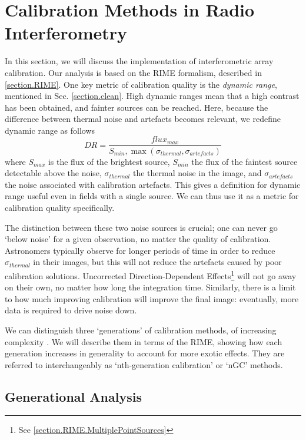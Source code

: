 
\section{Calibration Methods in Radio Interferometry}\label{section.calibration}
\pg
In this section, we will discuss the implementation of interferometric array calibration. Our analysis is based on the RIME formalism, described in \cref{section.RIME}. One key metric of calibration quality is the \emph{dynamic range}, mentioned in Sec. \ref{section.clean}. High dynamic ranges mean that a high contrast has been obtained, and fainter sources can be reached. Here, because the difference between thermal noise and artefacts becomes relevant, we redefine dynamic range as follows
\begin{equation}\label{eq.DR}
DR = \frac{flux_{max}}{S_{min},\max(\sigma_{thermal},\sigma_{artefacts})}
\end{equation}
where $S_{max}$ is the flux of the brightest source, $S_{min}$ the flux of the faintest source detectable above the noise, $\sigma_{thermal}$ the thermal noise in the image, and $\sigma_{artefacts}$ the noise associated with calibration artefacts. This gives a definition for dynamic range useful even in fields with a single source. We can thus use it as a metric for calibration quality specifically.

\pg
The distinction between these two noise sources is crucial; one can never go `below noise' for a given observation, no matter the quality of calibration. Astronomers typically observe for longer periods of time in order to reduce $\sigma_{thermal}$ in their images, but this will not reduce the artefacts caused by poor calibration solutions. Uncorrected Direction-Dependent Effects\footnote{See \cref{section.RIME.MultiplePointSources}} will not go away on their own, no matter how long the integration time. Similarly, there is a limit to how much improving calibration will improve the final image: eventually, more data is required to drive noise down.

\pg
We can distinguish three `generations' of calibration methods, of increasing complexity . We will describe them in terms of the RIME, showing how each generation increases in generality to account for more exotic effects. They are referred to interchangeably as `nth-generation calibration' or `nGC' methods.

\subsection{Generational Analysis}

